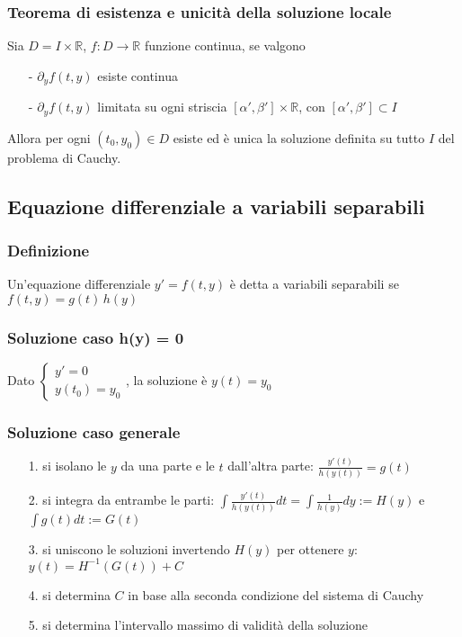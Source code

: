 \documentclass[a4paper]{article}
\newcommand\R{\mathbb{R}}     %
\begin{document}
\subsubsection*{Teorema di esistenza e unicità della soluzione locale}
Sia \(D = I \times \R\), \(f: D \to \R\) funzione continua, se valgono
\begin{itemize}[topsep=3pt, itemsep=0pt]
	\item[-] \(\partial_y f(t,y)\) esiste continua
	\item[-] \(\partial_y f(t,y)\) limitata su ogni striscia \([\alpha', \beta'] \times \R\), con \([\alpha', \beta'] \subset I\)
\end{itemize}
Allora per ogni \((t_0,y_0) \in D\) esiste ed è unica la soluzione definita su tutto \(I\) del problema di Cauchy.

\subsection{Equazione differenziale a variabili separabili}
\subsubsection*{Definizione}
Un'equazione differenziale \(y' = f(t,y)\) è detta a variabili separabili se \(f(t,y) = g(t) \, h(y)\)

\subsubsection*{Soluzione caso h(y) = 0}
Dato \(\begin{cases} y' = 0 \\ y(t_0) = y_0 \end{cases}\), la soluzione è \(y(t) = y_0\)

\subsubsection*{Soluzione caso generale}
\begin{itemize}[topsep=3pt, itemsep=0pt]
	\item[1.] si isolano le \(y\) da una parte e le \(t\) dall'altra parte: \(\frac{y'(t)}{h(y(t))} = g(t)\)
	\item[2.] si integra da entrambe le parti: \(\int \frac{y'(t)}{h(y(t))} dt = \int \frac{1}{h(y)} dy := H(y)\) e \(\int g(t) dt := G(t)\)
	\item[3.] si uniscono le soluzioni invertendo \(H(y)\) per ottenere \(y\): \(y(t) = H^{-1}(G(t)) + C\)
	\item[4.] si determina \(C\) in base alla seconda condizione del sistema di Cauchy
	\item[5.] si determina l'intervallo massimo di validità della soluzione
\end{itemize}
\end{document}
